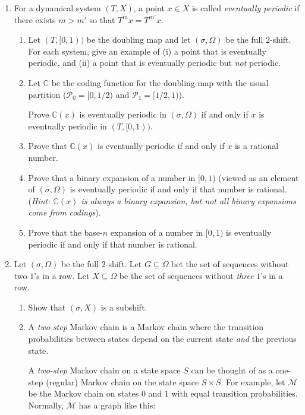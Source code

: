 \documentclass[letter]{article}
\newcommand{\setheader}[6]{
	\lhead{{\sc #1}\\{\sc #2} ({\small \it \today})}
	\rhead{
		{\bf #3} 
		\ifthenelse{\equal{#4}{}}{}{(#4)}\\
		{\bf #5} 
		\ifthenelse{\equal{#6}{}}{}{(#6)}%
	}
}
\newcommand{\C}{\mathbb{C}}
\begin{document}
	\setheader{MAT335}{Homework 4}{Due: 11:59pm April 9}{}{}{}

	\begin{enumerate}
		\item For a dynamical system $(T,X)$, a point $x\in X$ is called \emph{eventually periodic} if there 
			exists $m>m'$ so that $T^mx=T^{m'}x$.
		\begin{enumerate}
			\item Let $(T,[0,1))$ be the doubling map and let $(\sigma,\Omega)$ be the full $2$-shift.
				For each system, give an example of (i) a point that is eventually periodic, and (ii)
				a point that is eventually periodic but \emph{not} periodic.
			\item Let $\C$ be the coding function for the doubling map with the usual partition ($\mathcal P_0=[0,1/2)$
				and $\mathcal P_1=[1/2,1)$).

				Prove $\C(x)$ is eventually periodic in $(\sigma, \Omega)$ if and only if $x$ is eventually
				periodic in $(T,[0,1))$.
			\item Prove that $\C(x)$ is eventually periodic if and only if $x$ is a rational number.
			\item Prove that a binary expansion of a number in $[0,1)$  (viewed as an element of $(\sigma, \Omega)$ 
				is eventually periodic if and only
				if that number is rational. (\emph{Hint: $\C(x)$ is always a binary expansion, but not all
				binary expansions come from codings}).
			\item Prove that the base-$n$ expansion of a number in $[0,1)$ is eventually periodic if and only if that
				number is rational.
		\end{enumerate}

		\item Let $(\sigma, \Omega)$ be the full $2$-shift. Let $G\subseteq\Omega$ 
			bet the set of sequences without two $1$'s in a row.
			Let $X\subseteq \Omega$ be the set of sequences without
                        \emph{three} $1$'s in a row.
			\begin{enumerate}
				\item Show that $(\sigma, X)$ is a subshift.
				\item A \emph{two-step} Markov chain is a Markov chain where the transition probabilities
					between states depend on the current state \emph{and} the previous state. 
					
					A \emph{two-step} Markov chain on a state space $S$ can be thought of as a 
					one-step (regular) Markov chain on the state space $S\times S$. For example, let
					$\mathcal M$ be the Markov
					chain on states $0$ and $1$ with equal transition probabilities.
					Normally, $\mathcal M$ has a graph like this:


\end{enumerate}
\end{enumerate}
\end{document}
